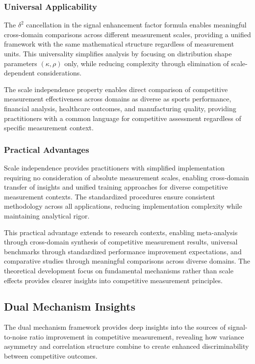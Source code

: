 \subsubsection{Universal Applicability}

The $\delta^2$ cancellation in the signal enhancement factor formula enables meaningful cross-domain comparisons across different measurement scales, providing a unified framework with the same mathematical structure regardless of measurement units. This universality simplifies analysis by focusing on distribution shape parameters $(\kappa, \rho)$ only, while reducing complexity through elimination of scale-dependent considerations.

The scale independence property enables direct comparison of competitive measurement effectiveness across domains as diverse as sports performance, financial analysis, healthcare outcomes, and manufacturing quality, providing practitioners with a common language for competitive assessment regardless of specific measurement context.

\subsubsection{Practical Advantages}

Scale independence provides practitioners with simplified implementation requiring no consideration of absolute measurement scales, enabling cross-domain transfer of insights and unified training approaches for diverse competitive measurement contexts. The standardized procedures ensure consistent methodology across all applications, reducing implementation complexity while maintaining analytical rigor.

This practical advantage extends to research contexts, enabling meta-analysis through cross-domain synthesis of competitive measurement results, universal benchmarks through standardized performance improvement expectations, and comparative studies through meaningful comparisons across diverse domains. The theoretical development focus on fundamental mechanisms rather than scale effects provides clearer insights into competitive measurement principles.

\subsection{Dual Mechanism Insights}

The dual mechanism framework provides deep insights into the sources of signal-to-noise ratio improvement in competitive measurement, revealing how variance asymmetry and correlation structure combine to create enhanced discriminability between competitive outcomes.

